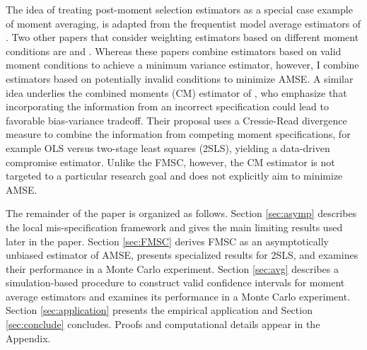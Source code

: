 The idea of treating post-moment selection estimators as a special case example of moment averaging, is adapted from the frequentist model average estimators of \cite{HjortClaeskens}.
Two other papers that consider weighting estimators based on different moment conditions are \cite{Xiao} and \cite{ChenChavezLinton}.
Whereas these papers combine estimators based on valid moment conditions to achieve a minimum variance estimator, however, I combine estimators based on potentially invalid conditions to minimize AMSE. 
A similar idea underlies the combined moments (CM) estimator of \cite{Judge2007}, who emphasize that incorporating the information from an incorrect specification could lead to favorable bias-variance tradeoff. 
Their proposal uses a Cressie-Read divergence measure to combine the information from competing moment specifications, for example OLS versus two-stage least squares (2SLS), yielding a data-driven compromise estimator. Unlike the FMSC, however, the CM estimator is not targeted to a particular research goal and does not explicitly aim to minimize AMSE.


The remainder of the paper is organized as follows.
Section \ref{sec:asymp} describes the local mis-specification framework and gives the main limiting results used later in the paper. 
Section \ref{sec:FMSC} derives FMSC as an asymptotically unbiased estimator of AMSE, presents specialized results for 2SLS, and examines their performance in a Monte Carlo experiment. 
Section \ref{sec:avg} describes a simulation-based procedure to construct valid confidence intervals for moment average estimators and examines its performance in a Monte Carlo experiment. Section \ref{sec:application} presents the empirical application and Section \ref{sec:conclude} concludes.
Proofs and computational details appear in the Appendix.